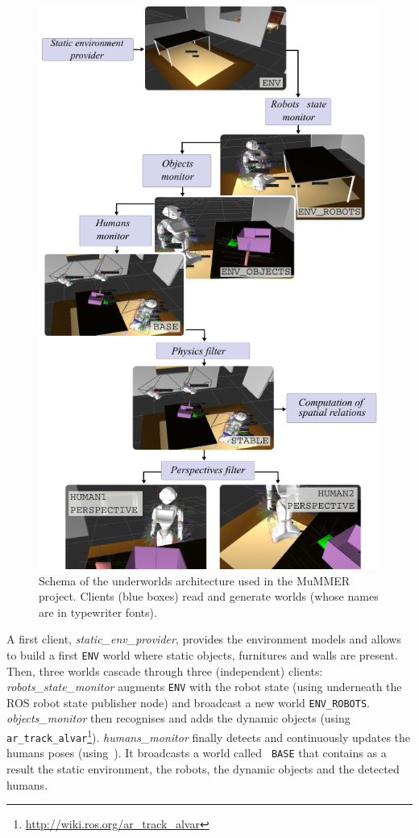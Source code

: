 \documentclass[letterpaper, 10pt, conference]{ieeeconf}
\newcommand{\uwds}{{\sc underworlds}\xspace}
\begin{document}
\begin{figure}
    \centering
    \includegraphics[width=\linewidth]{laasudws}
    \caption{Schema of the \uwds architecture used in the MuMMER project.
    Clients (blue boxes) read and generate worlds (whose names are in typewriter
    fonts).}
    \label{fig|mummerarchitecture}
\end{figure}

A first client, \textit{static\_env\_provider}, provides the environment models and
allows to build a first \texttt{ENV} world where static objects, furnitures and
walls are present.  Then, three worlds cascade through three (independent)
clients: \textit{robots\_state\_monitor} augments {\tt ENV} with the robot state
(using underneath the ROS robot state publisher node) and broadcast a new world
{\tt ENV\_ROBOTS}. \textit{objects\_monitor} then recognises and adds the
dynamic objects (using {\tt
ar\_track\_alvar}\footnote{\url{http://wiki.ros.org/ar_track_alvar}}).
\textit{humans\_monitor} finally detects and continuously updates the humans
poses (using~\cite{Khalidov_Idiap-RR-02-2017}). It broadcasts a world called {\tt
BASE} that contains as a result the static environment, the robots, the dynamic
objects and the detected humans.
\end{document}
